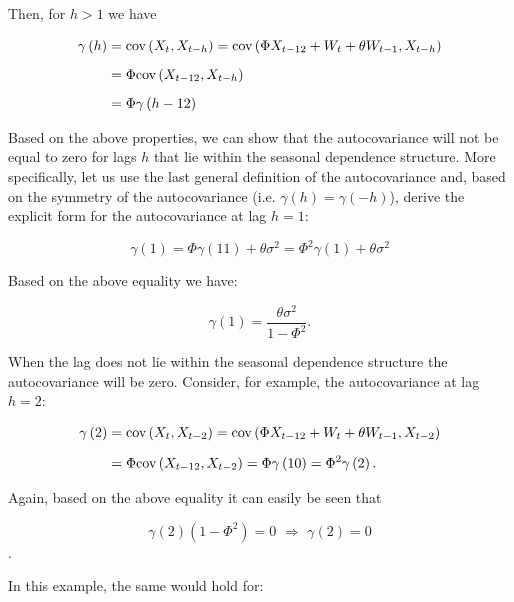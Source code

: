 \documentclass[]{book}
\theoremstyle{definition}
\theoremstyle{definition}
\theoremstyle{definition}
\theoremstyle{remark}
\begin{document}
Then, for \(h > 1\) we have

\begin{align}
  \gamma \left( h \right) &= \text{cov}\left( {{X_t},{X_{t - h}}} \right) = \text{cov}\left( {\Phi {X_{t - 12}} + {W_t} + \theta {W_{t - 1}},{X_{t - h}}} \right) \notag \\[0.2cm]
  &= \Phi \text{cov}\left( {{X_{t - 12}},{X_{t - h}}} \right) \notag \\[0.2cm]
   &= \Phi \gamma \left( {h - 12} \right) \\
\end{align}

Based on the above properties, we can show that the autocovariance will
not be equal to zero for lags \(h\) that lie within the seasonal
dependence structure. More specifically, let us use the last general
definition of the autocovariance and, based on the symmetry of the
autocovariance (i.e. \(\gamma (h) = \gamma(-h)\)), derive the explicit
form for the autocovariance at lag \(h = 1\):

\begin{equation}
 \gamma \left( 1 \right) = \Phi \gamma \left( {11} \right) + \theta {\sigma ^2} = {\Phi ^2}\gamma \left( 1 \right) + \theta {\sigma ^2}
\end{equation}

Based on the above equality we have:

\[\gamma \left( 1 \right) = \frac{{\theta {\sigma ^2}}}{{1 - {\Phi ^2}}}.\]

When the lag does not lie within the seasonal dependence structure the
autocovariance will be zero. Consider, for example, the autocovariance
at lag \(h=2\):

\begin{align}
  \gamma \left( 2 \right) &= \text{cov} \left( {{X_t},{X_{t - 2}}} \right) = \operatorname{cov} \left( {\Phi {X_{t - 12}} + {W_t} + \theta {W_{t - 1}},{X_{t - 2}}} \right) \notag \\[0.2cm]
   &= \Phi \text{cov} \left( {{X_{t - 12}},{X_{t - 2}}} \right) = \Phi \gamma \left( {10} \right) = {\Phi ^2}\gamma \left( 2 \right).
\end{align}

Again, based on the above equality it can easily be seen that

\[\gamma \left( 2 \right) \left(1 -  {\Phi ^2}\right) = 0 \,\, \Rightarrow \,\, \gamma \left( 2 \right) = 0\].

In this example, the same would hold for:
\end{document}

